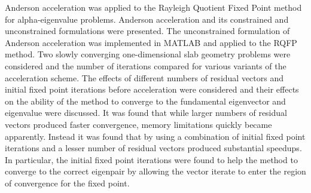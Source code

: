 Anderson acceleration was applied to the Rayleigh Quotient Fixed Point method for alpha-eigenvalue problems. Anderson acceleration and its constrained and unconstrained formulations were presented. The unconstrained formulation of Anderson acceleration was implemented in MATLAB and applied to the RQFP method. Two slowly converging one-dimensional slab geometry problems were considered and the number of iterations compared for various variants of the acceleration scheme. The effects of different numbers of residual vectors and initial fixed point iterations before acceleration were considered and their effects on the ability of the method to converge to the fundamental eigenvector and eigenvalue were discussed. It was found that while larger numbers of residual vectors produced faster convergence, memory limitations quickly became apparently. Instead it was found that by using a combination of initial fixed point iterations and a lesser number of residual vectors produced substantial speedups. In particular, the initial fixed point iterations were found to help the method to converge to the correct eigenpair by allowing the vector iterate to enter the region of convergence for the fixed point.